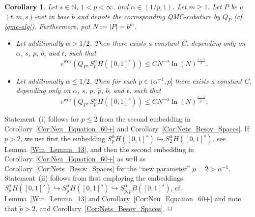 \documentclass[12pt]{article}
\DeclareMathOperator{\wor}{wor}
\newtheorem{corollary}{Corollary}
\newenvironment{proof}{\begin{trivlist}
    \item[\hskip\labelsep{\it Proof.}]}{$\hfill\Box$\end{trivlist}}
\newcommand{\N}{\mathbb{N}}
\newcommand{\mig}[1]{\textcolor{blue}{#1}}
\begin{document}
\begin{corollary}\label{Cor:Pre_Hauptresultat}
Let $s\in\N$, $1 < p < \infty$. and  $\alpha \in (1/p, 1)$. 
Let $m\ge 1$. Let $P$ be a $(t,m,s)$-net in base $b$ and denote the corresponding QMC-cubature  by $Q_P$ (cf.  \eqref{qmc-alg}). 
Furthermore, put $N:= |P| = b^m$.
\begin{itemize}
\item[{\rm (}i{\rm )}] Let additionally $\alpha > 1/2$. Then there exists a constant $C$, depending only on $\alpha$,
$s$, $p$, $b$, and $t$, such that
\begin{equation}\label{nets_sobolev}
e^{\wor}(Q_P, S^{\alpha}_{p}H([0,1]^s)) %
\le C N^{-\alpha} \ln(N)^{\frac{s-1}{2}}.
\end{equation}
\item[{\rm (}ii{\rm )}] Let additionally $\alpha \le 1/2$. Then for each $\widetilde{p} \in (\alpha^{-1}, p]$ there exists a constant $C$, depending only on $\alpha$,
$s$, $p$, $\widetilde{p}$, $b$, and $t$, such that
\begin{equation}\label{nets_sobolev_alpha_small}
e^{\wor}(Q_P, S^{\alpha}_{p}H([0,1]^s)) %
\le C N^{-\alpha} \ln(N)^{\frac{s-1}{\widetilde{p}'}}.
\end{equation}
\end{itemize}
\end{corollary}

\begin{proof}
Statement~(i) follows for $p\le 2$ from the second embedding in Corollary~\ref{Cor:Neu_Equation_60+} 
and Corollary~\ref{Cor:Nets_Besov_Spaces}. If $p>2$, we use first the embedding
$S^{\alpha}_{p}H([0,1]^s) \hookrightarrow S^{\alpha}_{2}H([0,1]^s)$, see Lemma~\ref{Win_Lemma_13}, and then the second embedding in Corollary~\ref{Cor:Neu_Equation_60+} 
as well as Corollary~\ref{Cor:Nets_Besov_Spaces} for the ``new parameter'' $p=2 > \alpha^{-1}$.\\
Statement~(ii) follows from first employing the embeddings $S^{\alpha}_{p}H([0,1]^s) \hookrightarrow S^{\alpha}_{\widetilde{p}}H([0,1]^s) \hookrightarrow S^{\alpha}_{\widetilde{p}, \widetilde{p}}B([0,1]^s)$, cf. Lemma~\ref{Win_Lemma_13} and Corollary~\ref{Cor:Neu_Equation_60+} and note that $\widetilde{p} > 2$, and Corollary~\ref{Cor:Nets_Besov_Spaces}.
\end{proof}
\end{document}
